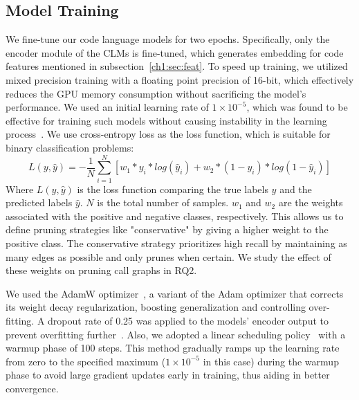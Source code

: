 \subsection{Model Training}
We fine-tune our code language models %
for two epochs. Specifically, only the encoder module of the CLMs is fine-tuned, which generates embedding for code features mentioned in subsection~\ref{ch1:sec:feat}. To speed up training, we utilized mixed precision training with a floating point precision of 16-bit, which effectively reduces the GPU memory consumption without sacrificing the model's performance. We used an initial learning rate of $1 \times 10^{-5}$, which was found to be effective for training such models without causing instability in the learning process~\cite{le2022autopruner}.
We use cross-entropy loss as the loss function, which is suitable for binary classification problems:
%
\begin{equation}\label{eq:cross-entropy}
L(y, \hat{y}) = -\frac{1}{N} \sum_{i=1}^{N} [w_{1} * y_{i} * log(\hat{y}_{i}) + w_{2} * (1-y_{i}) * log(1-\hat{y}_{i})]
\end{equation}
%
Where $L(y, \hat{y})$ is the loss function comparing the true labels $y$ and the predicted labels $\hat{y}$. $N$ is the total number of samples. $w_{1}$ and $w_{2}$ are the weights associated with the positive and negative classes, respectively. This allows us to define pruning strategies like "conservative" by giving a higher weight to the positive class. The conservative strategy prioritizes high recall by maintaining as many edges as possible and only prunes when certain. We study the effect of these weights on pruning call graphs in RQ2.

We used the AdamW optimizer~\cite{loshchilov2017decoupled}, a variant of the Adam optimizer that corrects its weight decay regularization, boosting generalization and controlling over-fitting. A dropout rate of 0.25 was applied to the models' encoder output to prevent overfitting further~\cite{srivastava2014dropout}. Also, we adopted a linear scheduling policy~\cite{goyal2017accurate} with a warmup phase of 100 steps. This method gradually ramps up the learning rate from zero to the specified maximum ($1 \times 10^{-5}$ in this case) during the warmup phase to avoid large gradient updates early in training, thus aiding in better convergence.

